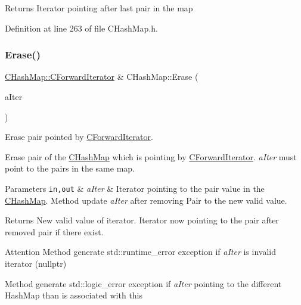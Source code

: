 \begin{DoxyReturn}{Returns}
Iterator pointing after last pair in the map 
\end{DoxyReturn}


Definition at line 263 of file C\+Hash\+Map.\+h.

\mbox{\label{class_c_hash_map_a644b7450021eb6f1a7d2b03f7dbe1832}} 
\subsubsection{\texorpdfstring{Erase()}{Erase()}\hspace{0.1cm}{\footnotesize\ttfamily [1/2]}}
{\footnotesize\ttfamily \hyperlink{class_c_hash_map_1_1_c_forward_iterator}{C\+Hash\+Map\+::\+C\+Forward\+Iterator} \& C\+Hash\+Map\+::\+Erase (\begin{DoxyParamCaption}\item[{\hyperlink{class_c_hash_map_1_1_c_forward_iterator}{C\+Hash\+Map\+::\+C\+Forward\+Iterator} \&}]{a\+Iter }\end{DoxyParamCaption})}



Erase pair pointed by \hyperlink{class_c_hash_map_1_1_c_forward_iterator}{C\+Forward\+Iterator}. 

Erase pair of the \hyperlink{class_c_hash_map}{C\+Hash\+Map} which is pointing by \hyperlink{class_c_hash_map_1_1_c_forward_iterator}{C\+Forward\+Iterator}. {\itshape a\+Iter} must point to the pairs in the same map. 
\begin{DoxyParams}[1]{Parameters}
\mbox{\tt in,out}  & {\em a\+Iter} & Iterator pointing to the pair value in the \hyperlink{class_c_hash_map}{C\+Hash\+Map}. Method update {\itshape a\+Iter} after removing Pair to the new valid value. \\
\hline
\end{DoxyParams}
\begin{DoxyReturn}{Returns}
New valid value of iterator. Iterator now pointing to the pair after removed pair if there exist. 
\end{DoxyReturn}
\begin{DoxyAttention}{Attention}
Method generate {\ttfamily std\+::runtime\+\_\+error} exception if {\itshape a\+Iter} is invalid iterator (nullptr) 

Method generate {\ttfamily std\+::logic\+\_\+error} exception if {\itshape a\+Iter} pointing to the different Hash\+Map than is associated with {\ttfamily this} 
\end{DoxyAttention}


